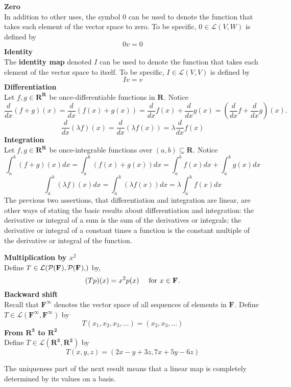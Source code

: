 \documentclass[11pt]{article} %
\newcommand\R[1]{\text{$\mathbf{R^{#1}}$}}
\newcommand\F[1]{\text{$\mathbf{F^{#1}}$}}
\newcommand\0{\text{$\mathbf{0}$}}
\renewcommand\L[2]{\mathcal{L}(#1,#2)}
\newcommand\poly[1]{\mathcal{P}_{#1}(\F{})}
\begin{document}
{
\textbf{Zero}\\
In addition to other uses, the symbol $0$ can be used to denote the function that takes each element of the vector space to zero. To be specific, $0 \in \L{V}{W}$ is defined by $$0v = 0$$
\textbf{Identity}\\
The \textbf{identity map} denoted $I$ can be used to denote the function that takes each element of the vector space to itself. To be specific, $I \in \L{V}{V}$ is defined by $$Iv = v$$
\textbf{Differentiation}\\
Let $f, g \in \R{\R{}}$ be once-differentiable functions in $\R{}$. Notice 
$$\frac{d}{dx}(f + g)(x) =  \frac{d}{dx}(f(x) + g(x)) = \frac{d}{dx}f(x) + \frac{d}{dx}g(x) = (\frac{d}{dx}f + \frac{d}{dx}g)(x).$$
$$\frac{d}{dx}(\lambda f)(x) = \frac{d}{dx}(\lambda f(x)) = \lambda \frac{d}{dx}f(x)$$
\textbf{Integration}\\
Let $f, g \in \R{\R{}}$ be once-integrable functions over $(a,b) \subseteq \R{}$. Notice 
$$\int_a^b (f + g)(x) dx =  \int_a^b (f(x) + g(x)) dx = \int_a^b f(x) dx + \int_a^b g(x)dx$$
$$\int_a^b (\lambda f)(x) dx = \int_a^b (\lambda f(x)) dx= \lambda \int_a^b f(x) dx$$
}
The previous two assertions, that differentiation and integration are linear, are other ways of stating the basic results about differentiation and integration: the derivative or integral of a sum is the sum of the derivatives or integrals; the derivative or integral of a constant times a function is the constant multiple of the derivative or integral of the function.

{
\textbf{Multiplication by $x^2$}\\
Define $T \in \L{\poly{}, \poly{}}$ by, $$(Tp)(x) = x^2 p(x) \hspace{10 pt} \text{ for } x \in \F{}.$$
\textbf{Backward shift}\\
Recall that $\F{\infty}$ denotes the vector space of all sequences of elements in $\F{}$. Define $T \in \L{\F{\infty}}{\F{\infty}}$ by $$T(x_1, x_2, x_3, \ldots) = (x_2, x_3, \ldots)$$
\textbf{From $\R{3}$ to $\R{2}$}\\
Define $T \in \L{\R{3}}{\R{2}}$ by $$T(x,y,z) = (2x - y + 3z, 7x + 5y - 6z)$$
}

The uniqueness part of the next result means that a linear map is completely determined by its values on a basis.
\end{document}
